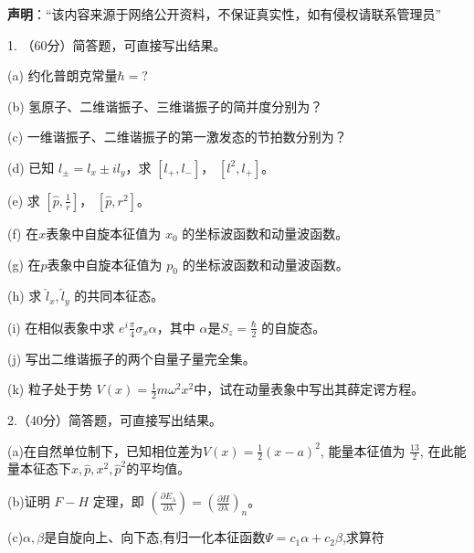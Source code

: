 
\textbf{声明}：“该内容来源于网络公开资料，不保证真实性，如有侵权请联系管理员”

1. （60分）简答题，可直接写出结果。

(a) 约化普朗克常量$\hbar = ?$

(b) 氢原子、二维谐振子、三维谐振子的简并度分别为？

(c) 一维谐振子、二维谐振子的第一激发态的节拍数分别为？

(d) 已知 $l_\pm = l_x \pm il_y $，求 $[l_+, l_-]$， $[l^2, l_+]$。

(e) 求 $[\hat p, \frac{1}{r}]$， $[\hat p, r^2]$。

(f) 在$x$表象中自旋本征值为 $x_0$ 的坐标波函数和动量波函数。

(g) 在$p$表象中自旋本征值为 $p_0$ 的坐标波函数和动量波函数。

(h) 求 $\hat l_x,\hat l_y$ 的共同本征态。

(i) 在相似表象中求 $e^i\frac{\pi}{4}\sigma_x\alpha$，其中 $\alpha$是$S_z =\frac{\hbar}{2} $ 的自旋态。

(j) 写出二维谐振子的两个自量子量完全集。

(k) 粒子处于势 $V(x) = \frac{1}{2}m\omega^2x^2$中，试在动量表象中写出其薛定谔方程。

2.（40分）简答题，可直接写出结果。

(a)在自然单位制下，已知相位差为$V(x) = \frac{1}{2} (x-a)^2$, 能量本征值为 $\frac{13}{2}$, 在此能量本征态下$x,\hat p,x^2,\hat p^2$的平均值。

(b)证明 $F-H$ 定理，即 
$\left( \frac{\partial E_{\lambda}}{\partial \lambda} \right) = \left( \frac{\partial H}{\partial \lambda} \right)_n$。

(c)$\alpha,\beta$是自旋向上、向下态,有归一化本征函数$\Psi=c_1\alpha+c_2\beta$,求算符